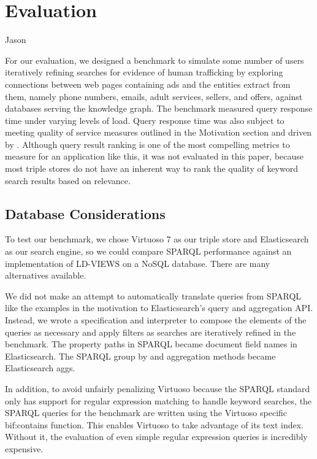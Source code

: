 \section{Evaluation}
\label{sec:evaluation}
Jason



For our evaluation, we designed a benchmark to simulate some number of users iteratively refining searches for evidence of human trafficking by exploring connections between web pages containing ads and the entities extract from them, namely phone numbers, emails, adult services, sellers, and offers, against databases serving the knowledge graph.
The benchmark measured query response time under varying levels of load.
Query response time was also subject to meeting quality of service measures outlined in the Motivation section and driven by \cite{nielsen1994usability}.
Although query result ranking is one of the most compelling metrics to measure for an application like this, it was not evaluated in this paper, because most triple stores do not have an inherent way to rank the quality of keyword search results based on relevance.

\subsection{Database Considerations}
To test our benchmark, we chose Virtuoso 7 as our triple store and Elasticsearch as our search engine, so we could compare SPARQL performance against an implementation of LD-VIEWS on a NoSQL database.  
There are many alternatives available.  

We did not make an attempt to automatically translate queries from SPARQL like the examples in the motivation to Elasticsearch's query and aggregation API.  
Instead, we wrote a specification and interpreter to compose the elements of the queries as necessary and apply filters as searches are iteratively refined in the benchmark.  
The property paths in SPARQL became document field names in Elasticsearch.  
The SPARQL group by and aggregation methods became Elasticsearch aggs. 

In addition, to avoid unfairly penalizing Virtuoso because the SPARQL standard only has support for regular expression matching to handle keyword searches, the SPARQL queries for the benchmark are written using the Virtuoso specific bif:contains function.
This enables Virtuoso to take advantage of its text index.  
Without it, the evaluation of even simple regular expression queries is incredibly expensive.  

